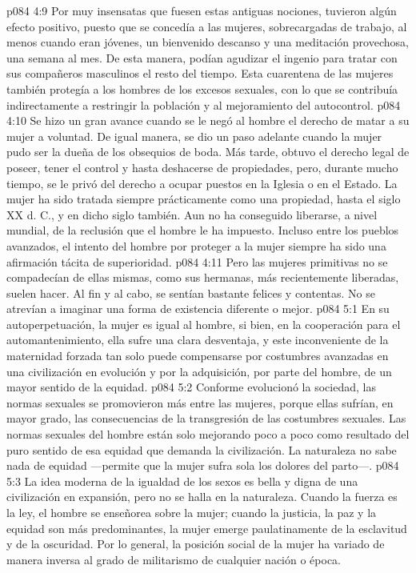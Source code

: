 \vs p084 4:9 Por muy insensatas que fuesen estas antiguas nociones, tuvieron algún efecto positivo, puesto que se concedía a las mujeres, sobrecargadas de trabajo, al menos cuando eran jóvenes, un bienvenido descanso y una meditación provechosa, una semana al mes. De esta manera, podían agudizar el ingenio para tratar con sus compañeros masculinos el resto del tiempo. Esta cuarentena de las mujeres también protegía a los hombres de los excesos sexuales, con lo que se contribuía indirectamente a restringir la población y al mejoramiento del autocontrol.
\vs p084 4:10 \pc Se hizo un gran avance cuando se le negó al hombre el derecho de matar a su mujer a voluntad. De igual manera, se dio un paso adelante cuando la mujer pudo ser la dueña de los obsequios de boda. Más tarde, obtuvo el derecho legal de poseer, tener el control y hasta deshacerse de propiedades, pero, durante mucho tiempo, se le privó del derecho a ocupar puestos en la Iglesia o en el Estado. La mujer ha sido tratada siempre prácticamente como una propiedad, hasta el siglo XX d. C., y en dicho siglo también. Aun no ha conseguido liberarse, a nivel mundial, de la reclusión que el hombre le ha impuesto. Incluso entre los pueblos avanzados, el intento del hombre por proteger a la mujer siempre ha sido una afirmación tácita de superioridad.
\vs p084 4:11 Pero las mujeres primitivas no se compadecían de ellas mismas, como sus hermanas, más recientemente liberadas, suelen hacer. Al fin y al cabo, se sentían bastante felices y contentas. No se atrevían a imaginar una forma de existencia diferente o mejor.
\vs p084 5:1 En su autoperpetuación, la mujer es igual al hombre, si bien, en la cooperación para el automantenimiento, ella sufre una clara desventaja, y este inconveniente de la maternidad forzada tan solo puede compensarse por costumbres avanzadas en una civilización en evolución y por la adquisición, por parte del hombre, de un mayor sentido de la equidad.
\vs p084 5:2 Conforme evolucionó la sociedad, las normas sexuales se promovieron más entre las mujeres, porque ellas sufrían, en mayor grado, las consecuencias de la transgresión de las costumbres sexuales. Las normas sexuales del hombre están solo mejorando poco a poco como resultado del puro sentido de esa equidad que demanda la civilización. La naturaleza no sabe nada de equidad ---permite que la mujer sufra sola los dolores del parto---.
\vs p084 5:3 La idea moderna de la igualdad de los sexos es bella y digna de una civilización en expansión, pero no se halla en la naturaleza. Cuando la fuerza es la ley, el hombre se enseñorea sobre la mujer; cuando la justicia, la paz y la equidad son más predominantes, la mujer emerge paulatinamente de la esclavitud y de la oscuridad. Por lo general, la posición social de la mujer ha variado de manera inversa al grado de militarismo de cualquier nación o época.

